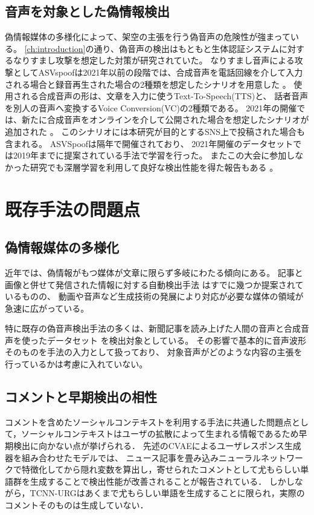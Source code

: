 \subsection{音声を対象とした偽情報検出}
偽情報媒体の多様化によって、架空の主張を行う偽音声の危険性が強まっている。
\cref{ch:introduction}の通り、偽音声の検出はもともと生体認証システムに対するなりすまし攻撃を想定した対策が研究されていた。
なりすまし音声による攻撃としてASVspoofは2021年以前の段階では、合成音声を電話回線を介して入力される場合と録音再生された場合の2種類を想定したシナリオを用意した \cite{7858696}。
使用される合成音声の形は、文章を入力に使うText-To-Speech(TTS)と、
話者音声を別人の音声へ変換するVoice Conversion(VC)の2種類である。
2021年の開催では、新たに合成音声をオンラインを介して公開された場合を想定したシナリオが追加された \cite{yamagishi21_asvspoof}。
このシナリオには本研究が目的とするSNS上で投稿された場合も含まれる。
ASVSpoofは隔年で開催されており、
2021年開催のデータセットでは2019年までに提案されている手法で学習を行った。
またこの大会に参加しなかった研究でも深層学習を利用して良好な検出性能を得た報告もある \cite{10.1145/3394171.3413716}。

\section{既存手法の問題点}
\subsection{偽情報媒体の多様化}
近年では、偽情報がもつ媒体が文章に限らず多岐にわたる傾向にある。
記事と画像と併せて発信された情報に対する自動検出手法 \cite{10.1145/3219819.3219903,8919302}はすでに幾つか提案されているものの、
動画や音声など生成技術の発展により対応が必要な媒体の領域が急速に広がっている。

特に既存の偽音声検出手法の多くは、新聞記事を読み上げた人間の音声と合成音声を使ったデータセット \cite{wu15e_interspeech,WANG2020101114}を検出対象としている。
その影響で基本的に音声波形そのものを手法の入力として扱っており、
対象音声がどのような内容の主張を行っているかは考慮に入れていない。

\subsection{コメントと早期検出の相性}
コメントを含めたソーシャルコンテキストを利用する手法に共通した問題点として，ソーシャルコンテキストはユーザの拡散によって生まれる情報であるため早期検出に向かない点が挙げられる．
先述のCVAEによるユーザレスポンス生成器を組み合わせたモデル\cite{ijcai2018-533}では、
ニュース記事を畳み込みニューラルネットワークで特徴化してから隠れ変数を算出し，寄せられたコメントとして尤もらしい単語群を生成することで検出性能が改善されることが報告されている．
しかしながら，TCNN-URGはあくまで尤もらしい単語を生成することに限られ，実際のコメントそのものは生成していない．

